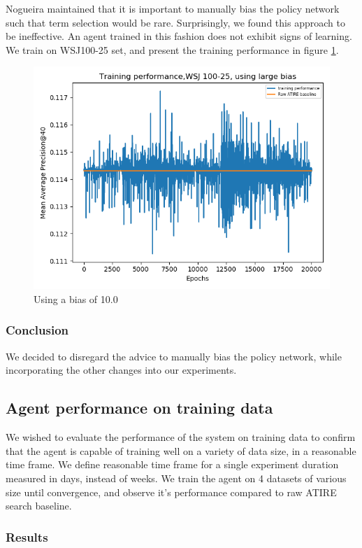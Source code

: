 Nogueira maintained that it is important to manually bias the policy network such that term selection would be rare. Surprisingly, we found this approach to be  ineffective. An agent trained in this fashion does not exhibit signs of learning. We train on WSJ100-25 set, and present the training performance in figure \ref{fig:largebias}.


\begin{figure}[H]
	\centering
	\includegraphics[width=0.7\linewidth]{images/chapter_4/second_system/large_bias}
	\caption{Using a bias of 10.0}
	\label{fig:largebias}
\end{figure}



\subsubsection{Conclusion}
We decided to disregard the advice to manually bias the policy network, while incorporating the other changes into our experiments.

\subsection{Agent performance on training data}

We wished to evaluate the performance of the system on training data to confirm that the agent is capable of training well on a variety of data size, in a reasonable time frame. We define reasonable time frame for a single experiment duration measured in days, instead of weeks. 
We train the agent on 4 datasets of various size until convergence, and observe it's performance compared to raw ATIRE search baseline.

\subsubsection{Results}

